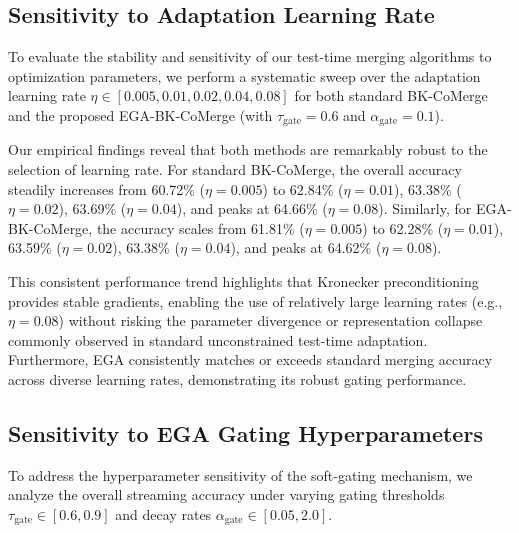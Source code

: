 \documentclass{article}
\theoremstyle{plain}
\theoremstyle{definition}
\theoremstyle{remark}
\begin{document}
\subsection{Sensitivity to Adaptation Learning Rate}
To evaluate the stability and sensitivity of our test-time merging algorithms to optimization parameters, we perform a systematic sweep over the adaptation learning rate $\eta \in [0.005, 0.01, 0.02, 0.04, 0.08]$ for both standard BK-CoMerge and the proposed EGA-BK-CoMerge (with $\tau_{\text{gate}} = 0.6$ and $\alpha_{\text{gate}} = 0.1$).

Our empirical findings reveal that both methods are remarkably robust to the selection of learning rate. For standard BK-CoMerge, the overall accuracy steadily increases from 60.72\% ($\eta=0.005$) to 62.84\% ($\eta=0.01$), 63.38\% ($\eta=0.02$), 63.69\% ($\eta=0.04$), and peaks at 64.66\% ($\eta=0.08$). Similarly, for EGA-BK-CoMerge, the accuracy scales from 61.81\% ($\eta=0.005$) to 62.28\% ($\eta=0.01$), 63.59\% ($\eta=0.02$), 63.38\% ($\eta=0.04$), and peaks at 64.62\% ($\eta=0.08$). 

This consistent performance trend highlights that Kronecker preconditioning provides stable gradients, enabling the use of relatively large learning rates (e.g., $\eta=0.08$) without risking the parameter divergence or representation collapse commonly observed in standard unconstrained test-time adaptation. Furthermore, EGA consistently matches or exceeds standard merging accuracy across diverse learning rates, demonstrating its robust gating performance.

\subsection{Sensitivity to EGA Gating Hyperparameters}
To address the hyperparameter sensitivity of the soft-gating mechanism, we analyze the overall streaming accuracy under varying gating thresholds $\tau_{\text{gate}} \in [0.6, 0.9]$ and decay rates $\alpha_{\text{gate}} \in [0.05, 2.0]$.
\end{document}
